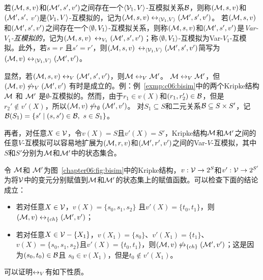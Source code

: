 若$({\cal M},s, v)$和$({\cal M}',s',v')$之间存在一个${\langle{{\cal V}_1, V}\rangle}$-互模拟关系${\cal B}$，则称$({\cal M},s, v)$和$({\cal M}',s',$ $v')$是${\langle{{\cal V}_1, V}\rangle}$-互模拟的，记为$({\cal M},s, v)\leftrightarrow_{\langle{{\cal V}_1, V}\rangle} ({\cal M}',s',v')$。
若$({\cal M},s, v)$和$({\cal M}',s',v')$之间存在一个${\langle{\emptyset, V_1}\rangle}$-互模拟关系，则称$({\cal M},s, v)$和$({\cal M}',s',v')$是{\em Var-$V_1$-互模拟的}，记为$({\cal M}, s,v) $ $\leftrightarrow_{V_1} ({\cal M}',s',v')$；称${\langle{\emptyset, V_1}\rangle}$-互模拟为Var-$V_1$-互模拟。此外，若$s=r$ 且$s'=r'$，则$({\cal M}, s,v) $ $\leftrightarrow_{{\langle{{\cal V}_1, V}\rangle}} ({\cal M}',s',v')$简写为$({\cal M}, v) \leftrightarrow_{{\langle{{\cal V}_1, V}\rangle}} ({\cal M}',v')$。

显然，若$({\cal M},s,v)\leftrightarrow_V({\cal M}',s',v')$，则${\cal M}\leftrightarrow_V{\cal M}'$。
${\cal M}\leftrightarrow_V{\cal M}'$，但$({\cal M},v)\not\leftrightarrow_V({\cal M}',v')$ 有时是成立的。例：例~\ref{exmp:c06:bisim}中的两个Kripke结构${\cal M}$ 和 ${\cal M}'$ 是$\emptyset$-互模拟的。然而，由于$r_1\in v(X)$和$(r_1,r_2')\in{\cal B}$，但是$r_2'\not\in v'(X)$，所以$({\cal M},v)\not\leftrightarrow_\emptyset ({\cal M}',v')$。
对$S_1\subseteq S$和二元关系${\cal B}\subseteq S \times S'$，记${\cal B}(S_1) =\{s' \mid (s, s')\in {\cal B},\ s \in S_1\}$。

再者，对任意$X\in {\cal V}$，令$v(X)=S$且$v'(X)=S'$，Kripke结构${\cal M}$和${\cal M}'$之间的任意$V$-互模拟可以容易地扩展为$({\cal M},r,v)$和$({\cal M}',r',v')$之间的Var-$V$-互模拟，其中$S$和$S'$分别为${\cal M}$和${\cal M}'$中的状态集合。

\begin{example}
	令 ${\cal M}$和 ${\cal M}'$为图~\ref{chapter06:fig:bisim}中的Kripke结构，$v: {\cal V} \rightarrow 2^S$和$v': {\cal V} \rightarrow 2^{S'}$为将${\cal V}$中的变元分别赋值到${\cal M}$和${\cal M}'$的状态集上的赋值函数。可以检查下面的结论成立：
	\begin{itemize}
		\item 若对任意$X\in\cal V$，$v(X)= \{s_0, s_1, s_2\}$ 且$v'(X)=\{t_0, t_1\}$，则$({\cal M},v)\leftrightarrow_{\{ch\}} ({\cal M}',v')$；
		
		\item 若对任意$X\in{\cal V}-\{X_1\}$，$v(X_1)= \{s_0\}$、$v'(X_1)=\{t_1\}$、$v(X)= \{s_0, s_1, s_2\}$且$v'(X)=\{t_0, t_1\}$，则$({\cal M},v)\not\leftrightarrow_{\{ch\}} ({\cal M}',v')$；这是因为$(s_0,t_0)\in {\cal B}$且 $s_0\in v(X_1)$，但是$t_0\notin v'(X_1)$。
	\end{itemize}
\end{example}



可以证明$\leftrightarrow_V$有如下性质。

